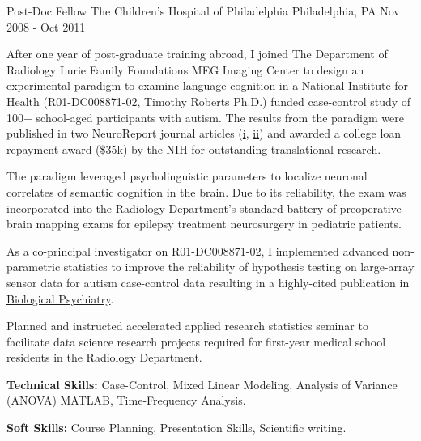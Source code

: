 \begin{cventries}
  \cventry
  {Post-Doc Fellow} %
  {The Children's Hospital of Philadelphia} %
  {Philadelphia, PA} %
  {Nov 2008 - Oct 2011} %
  {
    \begin{cvitems} %
      \item {After one year of post-graduate training abroad, I joined The Department of Radiology Lurie Family Foundations MEG Imaging Center to design an experimental paradigm to examine language cognition in a National Institute for Health (R01-DC008871-02, Timothy Roberts Ph.D.) funded case-control study of 100+ school-aged participants with autism. The results from the paradigm were published in two NeuroReport journal articles (\href{https://journals.lww.com/00001756-201112070-00007}{i}, \href{https://journals.lww.com/00001756-201107130-00003}{ii}) and awarded a college loan repayment award (\$35k) by the NIH for outstanding translational research.}
      \item {The paradigm leveraged psycholinguistic parameters to localize neuronal correlates of semantic cognition in the brain. Due to its reliability, the exam was incorporated into the Radiology Department's standard battery of preoperative brain mapping exams for epilepsy treatment neurosurgery in pediatric patients.}
      \item {As a co-principal investigator on R01-DC008871-02, I implemented advanced non-parametric statistics to improve the reliability of hypothesis testing on large-array sensor data for autism case-control data resulting in a highly-cited publication in \href{https://doi.org/10.1016/j.biopsych.2011.01.015}{Biological Psychiatry}}. 
      \item {Planned and instructed accelerated applied research statistics seminar to facilitate data science research projects required for first-year medical school residents in the Radiology Department.}
      \item {\textbf{Technical Skills:} Case-Control, Mixed Linear Modeling, Analysis of Variance (ANOVA) MATLAB, Time-Frequency Analysis.}
      \item {\textbf{Soft Skills:} Course Planning, Presentation Skills, Scientific writing.}
    \end{cvitems}
  }


\end{cventries}
